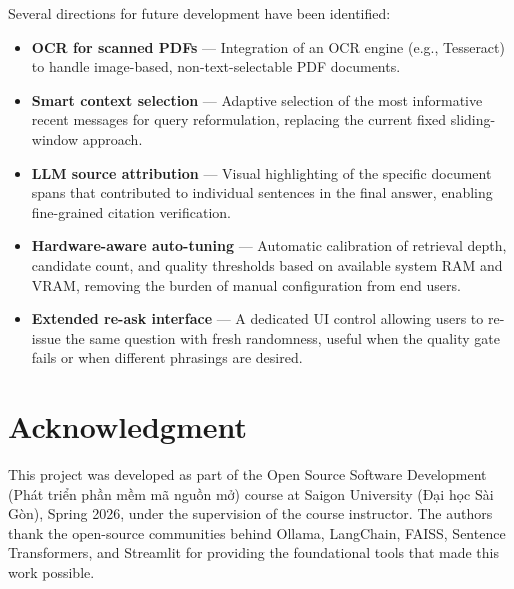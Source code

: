 \documentclass[10pt, conference, a4paper, compsocconf]{IEEEtran}
\begin{document}
Several directions for future development have been identified:

\begin{itemize}
  \item \textbf{OCR for scanned PDFs} --- Integration of an OCR engine
        (e.g., Tesseract) to handle image-based, non-text-selectable PDF
        documents.

  \item \textbf{Smart context selection} --- Adaptive selection of the
        most informative recent messages for query reformulation, replacing
        the current fixed sliding-window approach.

  \item \textbf{LLM source attribution} --- Visual highlighting of the
        specific document spans that contributed to individual sentences in
        the final answer, enabling fine-grained citation verification.

  \item \textbf{Hardware-aware auto-tuning} --- Automatic calibration of
        retrieval depth, candidate count, and quality thresholds based on
        available system RAM and VRAM, removing the burden of manual
        configuration from end users.

  \item \textbf{Extended re-ask interface} --- A dedicated UI control
        allowing users to re-issue the same question with fresh
        randomness, useful when the quality gate fails or when different
        phrasings are desired.
\end{itemize}


\section*{Acknowledgment}

This project was developed as part of the Open Source Software Development
(Phát triển phần mềm mã nguồn mở) course at Saigon University
(Đại học Sài Gòn), Spring 2026, under the supervision of the course
instructor. The authors thank the open-source communities behind Ollama,
LangChain, FAISS, Sentence Transformers, and Streamlit for providing the
foundational tools that made this work possible.




\end{document}
